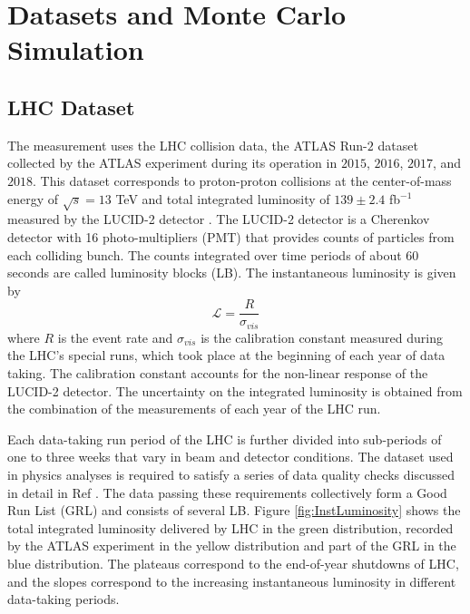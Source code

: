\section{Datasets and Monte Carlo Simulation}
\label{sec:DataSetAndMonteCarlo}

\subsection{LHC Dataset}
\label{subsec:Dataset}

The measurement uses the LHC collision data, the ATLAS Run-$2$ dataset collected by the ATLAS experiment during its operation in $2015$, $2016$, $2017$, and $2018$. This dataset corresponds to proton-proton collisions at the center-of-mass energy of $\sqrt{s} = 13$ TeV and total integrated luminosity of $139 \pm 2.4$ fb$^{-1}$ measured by the LUCID-2 detector \cite{ATLASLuminosityDetector}\cite{ATLASRun2IntegratedLumi}. The LUCID-2 detector is a Cherenkov detector with 16 photo-multipliers (PMT) that provides counts of particles from each colliding bunch. The counts integrated over time periods of about $60$ seconds are called luminosity blocks (LB). The instantaneous luminosity is given by 
\begin{equation}
  \mathcal{L} = \frac{R}{\sigma_{vis}}
\end{equation}
where $R$ is the event rate and $\sigma_{vis}$ is the calibration constant measured during the LHC's special runs, which took place at the beginning of each year of data taking. The calibration constant accounts for the non-linear response of the LUCID-2 detector. The uncertainty on the integrated luminosity is obtained from the combination of the measurements of each year of the LHC run.

Each data-taking run period of the LHC is further divided into sub-periods of one to three weeks that vary in beam and detector conditions. The dataset used in physics analyses is required to satisfy a series of data quality checks discussed in detail in Ref \cite{ATLASRun2DataTaking}. The data passing these requirements collectively form a Good Run List (GRL) and consists of several LB. Figure \ref{fig:InstLuminosity} shows the total integrated luminosity delivered by LHC in the green distribution, recorded by the ATLAS experiment in the yellow distribution and part of the GRL in the blue distribution. The plateaus correspond to the end-of-year shutdowns of LHC, and the slopes correspond to the increasing instantaneous luminosity in different data-taking periods. 

